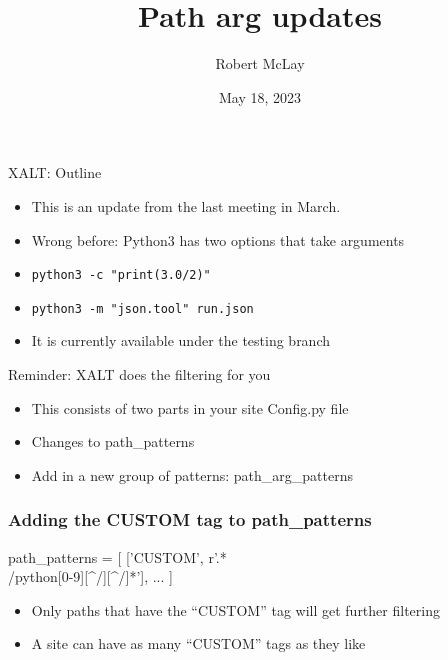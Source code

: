 \documentclass{beamer}
\begin{document}
\title[XALT]{Path arg updates}
\author{Robert McLay}
\date{May 18, 2023}

\frame{\titlepage}

\begin{frame}{XALT: Outline}
  \begin{itemize}
    \item This is an update from the last meeting in March.
    \item Wrong before: Python3 has two options that take arguments
    \item \texttt{python3 -c "print(3.0/2)"}
    \item \texttt{python3 -m "json.tool" run.json}
    \item It is currently available under the testing branch
  \end{itemize}
\end{frame}

\begin{frame}{Reminder: XALT does the filtering for you}
  \begin{itemize}
    \item This consists of two parts in your site Config.py file
    \item Changes to path\_patterns
    \item Add in a new group of patterns: path\_arg\_patterns
  \end{itemize}
\end{frame}

\begin{frame}[fragile]
    \frametitle{Adding the CUSTOM tag to path\_patterns}
 {\tiny
    \begin{semiverbatim}
path_patterns = [
    ['CUSTOM',  r'.*\\/python[0-9][^/][^/]*'],
    ...
]
    \end{semiverbatim}
}
  \begin{itemize}
    \item Only paths that have the ``CUSTOM'' tag will get further filtering
    \item A site can have as many ``CUSTOM'' tags as they like
  \end{itemize}

\end{frame}
\end{document}
